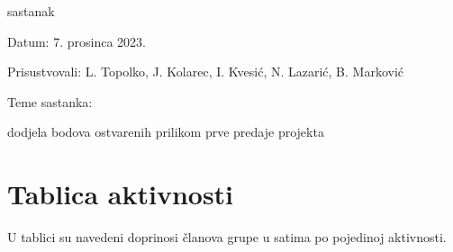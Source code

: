 \begin{packed_enum}
			
			\item  sastanak
			\item[] \begin{packed_item}
				\item Datum: 7. prosinca 2023.
				\item Prisustvovali: L. Topolko, J. Kolarec, I. Kvesić, N. Lazarić, B. Marković
				\item Teme sastanka:
				\begin{packed_item}
					\item dodjela bodova ostvarenih prilikom prve predaje projekta
				\end{packed_item}
			\end{packed_item}
			
			
		
		
		
		\end{packed_enum}
		
		
		
		\eject
		\section*{Tablica aktivnosti}
		
			\vspace{-0.1cm}
			
			U tablici su navedeni doprinosi članova grupe u satima po pojedinoj aktivnosti. 
		
